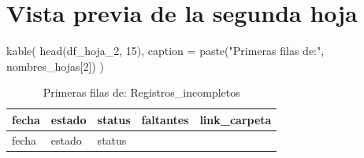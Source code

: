 \documentclass[
]{article}
\newenvironment{Shaded}{\begin{snugshade}}{\end{snugshade}}
\newcommand{\AttributeTok}[1]{\textcolor[rgb]{0.40,0.45,0.13}{#1}}
\newcommand{\DecValTok}[1]{\textcolor[rgb]{0.68,0.00,0.00}{#1}}
\newcommand{\FunctionTok}[1]{\textcolor[rgb]{0.28,0.35,0.67}{#1}}
\newcommand{\NormalTok}[1]{\textcolor[rgb]{0.00,0.23,0.31}{#1}}
\newcommand{\StringTok}[1]{\textcolor[rgb]{0.13,0.47,0.30}{#1}}
\begin{document}
\section{Vista previa de la segunda
hoja}\label{vista-previa-de-la-segunda-hoja}

\begin{Shaded}
\begin{Highlighting}[]
\FunctionTok{kable}\NormalTok{(}
  \FunctionTok{head}\NormalTok{(df\_hoja\_2, }\DecValTok{15}\NormalTok{),}
  \AttributeTok{caption =} \FunctionTok{paste}\NormalTok{(}\StringTok{"Primeras filas de:"}\NormalTok{, nombres\_hojas[}\DecValTok{2}\NormalTok{])}
\NormalTok{)}
\end{Highlighting}
\end{Shaded}

\begin{longtable}[]{@{}
  >{\raggedright\arraybackslash}p{}
  >{\raggedright\arraybackslash}p{}
  >{\raggedright\arraybackslash}p{}
  >{\raggedright\arraybackslash}p{}
  >{\raggedright\arraybackslash}p{}@{}}
\caption{Primeras filas de: Registros\_incompletos}\tabularnewline
\toprule\noalign{}
\begin{minipage}[b]{\linewidth}\raggedright
fecha
\end{minipage} & \begin{minipage}[b]{\linewidth}\raggedright
estado
\end{minipage} & \begin{minipage}[b]{\linewidth}\raggedright
status
\end{minipage} & \begin{minipage}[b]{\linewidth}\raggedright
faltantes
\end{minipage} & \begin{minipage}[b]{\linewidth}\raggedright
link\_carpeta
\end{minipage} \\
\midrule\noalign{}
\endfirsthead
\toprule\noalign{}
\begin{minipage}[b]{\linewidth}\raggedright
fecha
\end{minipage} & \begin{minipage}[b]{\linewidth}\raggedright
estado
\end{minipage} & \begin{minipage}[b]{\linewidth}\raggedright
status
\end{minipage} & \begin{minipage}[b]{\linewidth}\raggedright

\end{minipage}
\end{longtable}
\end{document}
